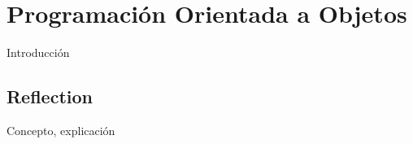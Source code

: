 \section{Programación Orientada a Objetos}

Introducción

\subsection{Reflection}

Concepto, explicación
